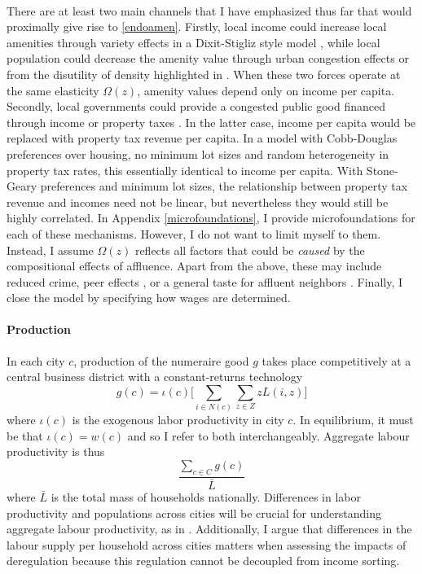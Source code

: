 \documentclass[11pt]{article}
\begin{document}
	 \paragraph*{}
	There are at least two main channels that I have emphasized thus far that would proximally give rise to \eqref{endoamen}. Firstly, local income could increase local amenities through variety effects in a Dixit-Stigliz style model \citep{AlmagroDI, Coutureetal}, while local population could decrease the amenity value through urban congestion effects or from the disutility of density highlighted in \citep{KSC}. When these two forces operate at the same elasticity $\Omega(z)$, amenity values depend only on income per capita. Secondly, local governments could provide a congested public good financed through income or property taxes \citep{calabresetal, ineffTiebout}. In the latter case, income per capita would be replaced with property tax revenue per capita. In a model with Cobb-Douglas preferences over housing, no minimum lot sizes and random heterogeneity in property tax rates, this essentially identical to income per capita. With Stone-Geary preferences and minimum lot sizes, the relationship between property tax revenue and incomes need not be linear, but nevertheless they would still be highly correlated. In Appendix \ref{microfoundations}, I provide microfoundations for each of these mechanisms. However, I do not want to limit myself to them. Instead, I assume $\Omega(z)$ reflects all factors that could be \textit{caused} by the compositional effects of affluence. Apart from the above, these may include reduced crime, peer effects \citep{chettyhendren}, or a general taste for affluent neighbors \citep{ghh2013, parispoor}. Finally, I close the model by specifying how wages are determined.

	\paragraph*{Production} In each city $c$, production of the numeraire good $g$ takes place competitively at a central business district with a constant-returns technology
	\begin{equation}\label{production}
		g(c) = \iota(c)\bigg[\sum_{i \in N(c)}\sum_{z \in Z}zL(i, z)\bigg]
	\end{equation}
	where $\iota(c)$ is the exogenous labor productivity in city $c$. In equilibrium, it must be that $\iota(c) = w(c)$ and so I 	refer to both interchangeably. Aggregate labour productivity is thus 
	\begin{equation*}
		\frac{\sum_{c \in C}g(c)}{\bar{L}}
	\end{equation*}
	 where $\bar{L}$ is the total mass of households nationally. Differences in labor productivity and populations across cities will be crucial for understanding aggregate labour productivity, as in \cite{hseihmoretti}. Additionally, I argue that differences in the labour supply per household across cities matters when assessing the impacts of deregulation because this regulation cannot be decoupled from income sorting.
 
\end{document}
